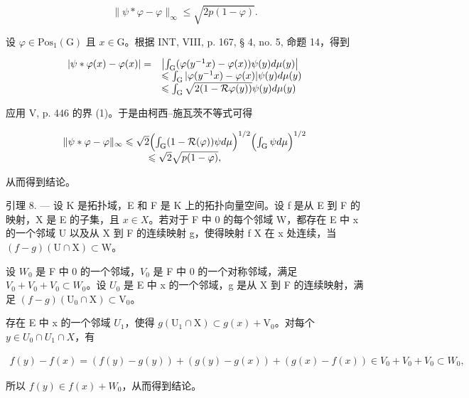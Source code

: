 \[
\| \psi * \varphi - \varphi \| _ {\infty} \leqslant \sqrt {2 p (1 - \varphi)}.
\]

设 \(\varphi\in\mathrm{Pos}_{1}(\mathrm{G})\) 且 \(x\in\mathrm{G}\)。根据 INT, VIII, p. 167, § 4, no. 5, 命题 14，得到

\[
\begin{array}{r l} | \psi * \varphi (x) - \varphi (x) | = & \left| \int_ {\mathrm{G}} (\varphi (y ^ {- 1} x) - \varphi (x)) \psi (y) d \mu (y) \right| \\ & \leqslant \int_ {\mathrm{G}} | \varphi (y ^ {- 1} x) - \varphi (x) | \psi (y) d \mu (y) \\ & \leqslant \int_ {\mathrm{G}} \sqrt {2 (1 - \mathcal {R}   \varphi (y))} \psi (y) d \mu (y) \end{array}
\]

应用 V, p. 446 的界 (1)。于是由柯西–施瓦茨不等式可得

\[
\begin{array}{c} \| \psi * \varphi - \varphi \| _ {\infty} \leqslant \sqrt {2} \Bigl (\int_ {\mathrm{G}} (1 - \mathcal {R} (\varphi)) \psi   d \mu \Bigr) ^ {1 / 2} \Bigl (\int_ {\mathrm{G}} \psi   d \mu \Bigr) ^ {1 / 2} \\ \leqslant \sqrt {2} \sqrt {p (1 - \varphi)}, \end{array}
\]

从而得到结论。

引理 8. --- 设 K 是拓扑域，E 和 F 是 K 上的拓扑向量空间。设 f 是从 E 到 F 的映射，X 是 E 的子集，且 \(x \in X\)。若对于 F 中 0 的每个邻域 W，都存在 E 中 x 的一个邻域 U 以及从 X 到 F 的连续映射 g，使得映射 f \textbar{} X 在 x 处连续，当 \((f - g)(\mathrm{U} \cap \mathrm{X}) \subset \mathrm{W}\)。

设 \(W_{0}\) 是 F 中 0 的一个邻域，\(V_{0}\) 是 F 中 0 的一个对称邻域，满足 \(V_{0} + V_{0} + V_{0} \subset W_{0}\)。设 \(U_{0}\) 是 E 中 x 的一个邻域，g 是从 X 到 F 的连续映射，满足 \((f - g)(\mathrm{U}_{0} \cap \mathrm{X}) \subset \mathrm{V}_{0}\)。

存在 E 中 x 的一个邻域 \(U_{1}\)，使得 \(g(\mathrm{U}_{1} \cap \mathrm{X}) \subset g(x) + \mathrm{V}_{0}\)。对每个 \(y \in U_{0} \cap U_{1} \cap X\)，有

\[
\begin{array}{c} f (y) - f (x) = (f (y) - g (y)) + (g (y) - g (x)) + (g (x) - f (x)) \in V_{0} + V_{0} + V_{0} \subset W_{0}, \end{array}
\]

所以 \(f(y) \in f(x) + W_{0}\)，从而得到结论。

